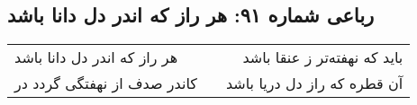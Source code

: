 \begin{center}
\section*{رباعی شماره ۹۱: هر راز که اندر دل دانا باشد}
\label{sec:sh091}
\begin{longtable}{l p{0.5cm} r}
هر راز که اندر دل دانا باشد
&&
باید که نهفته‌تر ز عنقا باشد
\\
کاندر صدف از نهفتگی گردد در
&&
آن قطره که راز دل دریا باشد
\\
\end{longtable}
\end{center}
